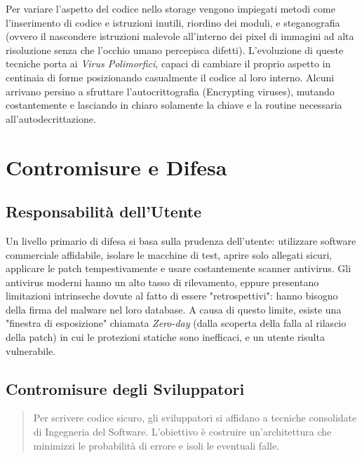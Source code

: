 \documentclass{article}
\begin{document}
Per variare l'aspetto del codice nello storage vengono impiegati metodi come l'inserimento di codice e istruzioni inutili, riordino dei moduli, e steganografia (ovvero il nascondere istruzioni malevole all'interno dei pixel di immagini ad alta risoluzione senza che l'occhio umano percepisca difetti). L'evoluzione di queste tecniche porta ai \textit{Virus Polimorfici}, capaci di cambiare il proprio aspetto in centinaia di forme posizionando casualmente il codice al loro interno. Alcuni arrivano persino a sfruttare l'autocrittografia (Encrypting viruses), mutando costantemente e lasciando in chiaro solamente la chiave e la routine necessaria all'autodecrittazione.

\vspace{0.8cm}

\section*{Contromisure e Difesa}

\subsection*{Responsabilità dell'Utente}

Un livello primario di difesa si basa sulla prudenza dell'utente: utilizzare software commerciale affidabile, isolare le macchine di test, aprire solo allegati sicuri, applicare le patch tempestivamente e usare costantemente scanner antivirus. Gli antivirus moderni hanno un alto tasso di rilevamento, eppure presentano limitazioni intrinseche dovute al fatto di essere "retrospettivi": hanno bisogno della firma del malware nel loro database. A causa di questo limite, esiste una "finestra di esposizione" chiamata \textit{Zero-day} (dalla scoperta della falla al rilascio della patch) in cui le protezioni statiche sono inefficaci, e un utente risulta vulnerabile.

\subsection*{Contromisure degli Sviluppatori}

\begin{quote}
    Per scrivere codice sicuro, gli sviluppatori si affidano a tecniche consolidate di Ingegneria del Software. L'obiettivo è costruire un'architettura che minimizzi le probabilità di errore e isoli le eventuali falle.
\end{quote}
\end{document}
